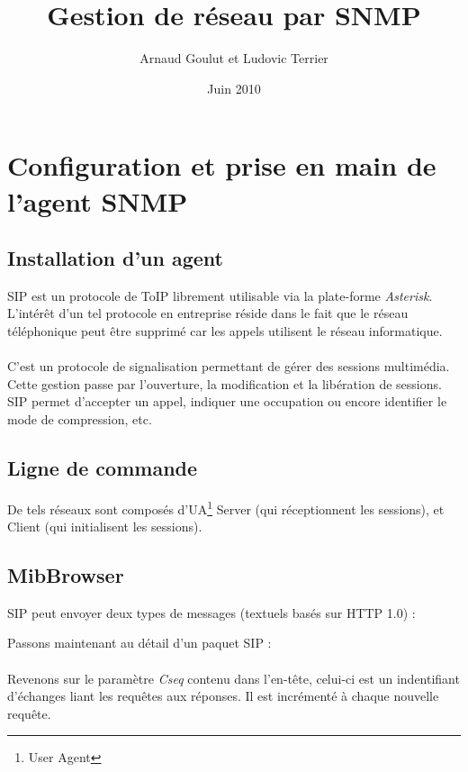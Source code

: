 \documentclass[12pt,a4paper,notitlepage]{article}
\begin{document}
\title{Gestion de réseau par SNMP}
\author{Arnaud Goulut et Ludovic Terrier}
\date{Juin 2010}
\maketitle



\thispagestyle{empty}


 
\section{Configuration et prise en main de l'agent SNMP}
\subsection{Installation d'un agent}
SIP est un protocole de ToIP librement utilisable via la plate-forme \textit{Asterisk}. L'intérêt d'un tel protocole en entreprise réside dans le fait que le réseau téléphonique peut être supprimé car les appels utilisent le réseau informatique.  

\paragraph{}C'est un protocole de signalisation permettant de gérer des sessions multimédia. Cette gestion passe par l'ouverture, la modification et la libération de sessions. SIP permet d'accepter un appel, indiquer une occupation ou encore identifier le mode de compression, etc. 

\subsection{Ligne de commande}
De tels réseaux sont composés d'UA\footnote{User Agent} Server (qui réceptionnent les sessions), et Client (qui initialisent les sessions).

\subsection{MibBrowser}
SIP peut envoyer deux types de messages (textuels basés sur HTTP 1.0) :


Passons maintenant au détail d'un paquet SIP :

\paragraph{} Revenons sur le paramètre \textit{Cseq} contenu dans l'en-tête, celui-ci est un indentifiant d'échanges liant les requêtes aux réponses. Il est incrémenté à chaque nouvelle requête.
\end{document}
